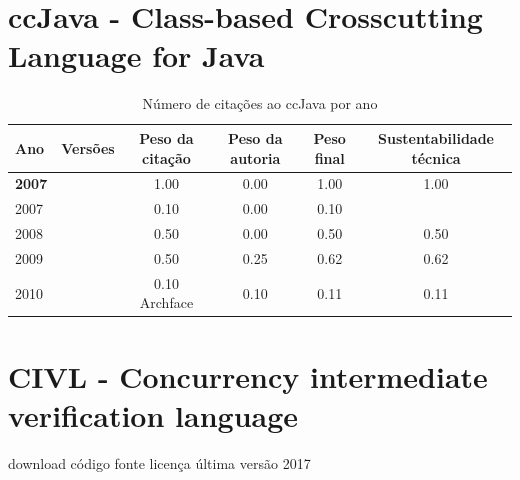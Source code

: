 \section{ccJava - Class-based Crosscutting Language for Java}


\begin{table}[H]
\caption{Número de citações ao ccJava  por ano}
\centering
\begin{tabular}{| l | c | c | c | c | c |}
  \hline
  Ano & Versões & Peso da citação & Peso da autoria & Peso final & Sustentabilidade técnica \\
  \hline
            {\bf 2007}
          &
          
          &
          1.00
          &
          0.00
          &
          1.00
          &
            {\color{blue} 1.00}
          \\
            2007
          &
          
          &
          0.10
          &
          0.00
          &
          0.10
          &
          \\
\hline
            2008
          &
          
          &
          0.50
          &
          0.00
          &
          0.50
          &
            {\color{blue} 0.50}
          \\
\hline
            2009
          &
          
          &
          0.50
          &
          0.25
          &
          0.62
          &
            {\color{blue} 0.62}
          \\
\hline
            2010
          &
          
          &
          0.10
            {\tiny Archface}
          &
          0.10
          &
          0.11
          &
            {\color{red} 0.11}
          \\
\hline
\end{tabular}
\end{table}



\section{CIVL - Concurrency intermediate verification language}
\checkmark download
\checkmark código fonte
\checkmark licença
\checkmark última versão 2017


